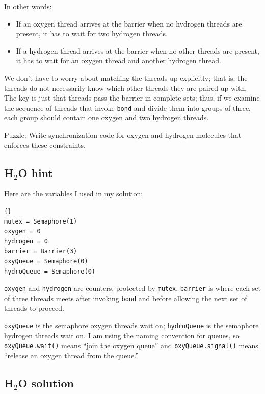 \documentclass{book}
\newcommand{\clearemptydoublepage}{\newpage\cleardoublepage}
\begin{document}
In other words:

\begin{itemize}

\item If an oxygen thread arrives at the barrier when no
hydrogen threads are present, it has to wait for two
hydrogen threads.

\item If a hydrogen thread arrives at the barrier when
no other threads are present, it has to wait for an
oxygen thread and another hydrogen thread.

\end{itemize}

We don't have to worry about matching the threads up explicitly; that
is, the threads do not necessarily know which other threads they are
paired up with.  The key is just that threads pass the barrier in
complete sets; thus, if we examine the sequence of threads that invoke
{\tt bond} and divide them into groups of three, each group should
contain one oxygen and two hydrogen threads.

Puzzle: Write synchronization code for oxygen and hydrogen
molecules that enforces these constraints.


\clearemptydoublepage
\subsection {H$_2$O hint}

Here are the variables I used in my solution:

\begin{lstlisting}[caption={Water building hint}]{}
mutex = Semaphore(1)
oxygen = 0
hydrogen = 0
barrier = Barrier(3)
oxyQueue = Semaphore(0)
hydroQueue = Semaphore(0)
\end{lstlisting}

{\tt oxygen} and {\tt hydrogen} are counters, protected by {\tt mutex}.
{\tt barrier} is where each set of three threads meets after
invoking {\tt bond} and before allowing the next set of threads
to proceed.

{\tt oxyQueue} is the semaphore oxygen threads wait on;
{\tt hydroQueue} is the semaphore hydrogen threads wait on.
I am using the naming convention for queues, so
{\tt oxyQueue.wait()} means ``join the oxygen queue'' and
{\tt oxyQueue.signal()} means ``release an oxygen thread from
the queue.''


\clearemptydoublepage
\subsection {H$_2$O solution}
\end{document}
